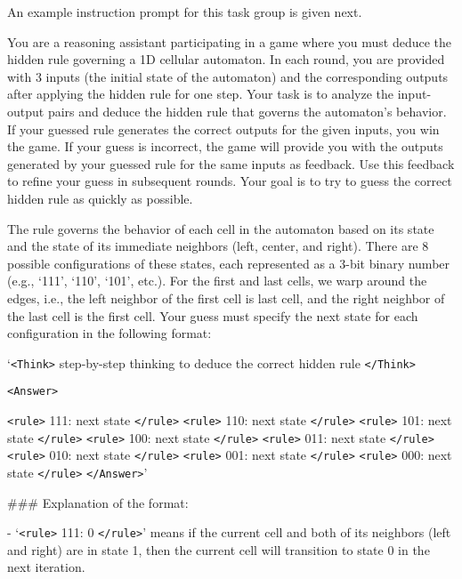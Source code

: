 An example instruction prompt for this task group is given next. 

\newpage

\begin{tcolorbox}[colback=gray!20, colframe=black, title=Cellular Automata Agent Prompt]
You are a reasoning assistant participating in a game where you must deduce the hidden rule governing a 1D cellular automaton. In each round, you are provided with 3 inputs (the initial state of the automaton) and the corresponding outputs after applying the hidden rule for one step. Your task is to analyze the input-output pairs and deduce the hidden rule that governs the automaton's behavior. If your guessed rule generates the correct outputs for the given inputs, you win the game. If your guess is incorrect, the game will provide you with the outputs generated by your guessed rule for the same inputs as feedback. Use this feedback to refine your guess in subsequent rounds. Your goal is to try to guess the correct hidden rule as quickly as possible. 

The rule governs the behavior of each cell in the automaton based on its state and the state of its immediate neighbors (left, center, and right). There are 8 possible configurations of these states, each represented as a 3-bit binary number (e.g., `111', `110', `101', etc.). For the first and last cells, we warp around the edges, i.e., the left neighbor of the first cell is last cell, and the right neighbor of the last cell is the first cell. Your guess must specify the next state for each configuration in the following format:

`\texttt{<Think>} step-by-step thinking to deduce the correct hidden rule \texttt{</Think>}

\texttt{<Answer>}

\texttt{<rule>} 111: next state \texttt{</rule>} \texttt{<rule>} 110: next state \texttt{</rule>} \texttt{<rule>} 101: next state \texttt{</rule>} \texttt{<rule>} 100: next state \texttt{</rule>} \texttt{<rule>} 011: next state \texttt{</rule>} \texttt{<rule>} 010: next state \texttt{</rule>} \texttt{<rule>} 001: next state \texttt{</rule>} \texttt{<rule>} 000: next state \texttt{</rule>}
\texttt{</Answer>}'

\#\#\# Explanation of the format:

- `\texttt{<rule>} 111: 0 \texttt{</rule>}' means if the current cell and both of its neighbors (left and right) are in state 1, then the current cell will transition to state 0 in the next iteration.


\end{tcolorbox}
